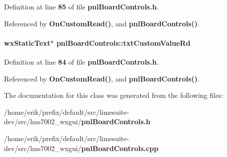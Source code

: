 Definition at line {\bf 85} of file {\bf pnl\+Board\+Controls.\+h}.



Referenced by {\bf On\+Custom\+Read()}, and {\bf pnl\+Board\+Controls()}.

\paragraph[{txt\+Custom\+Value\+Rd}]{\setlength{\rightskip}{0pt plus 5cm}wx\+Static\+Text$\ast$ pnl\+Board\+Controls\+::txt\+Custom\+Value\+Rd\hspace{0.3cm}{\ttfamily [protected]}}\label{classpnlBoardControls_a0079646fb23052b7456a804af28b8d90}


Definition at line {\bf 84} of file {\bf pnl\+Board\+Controls.\+h}.



Referenced by {\bf On\+Custom\+Read()}, and {\bf pnl\+Board\+Controls()}.



The documentation for this class was generated from the following files\+:\begin{DoxyCompactItemize}
\item 
/home/erik/prefix/default/src/limesuite-\/dev/src/lms7002\+\_\+wxgui/{\bf pnl\+Board\+Controls.\+h}\item 
/home/erik/prefix/default/src/limesuite-\/dev/src/lms7002\+\_\+wxgui/{\bf pnl\+Board\+Controls.\+cpp}\end{DoxyCompactItemize}
